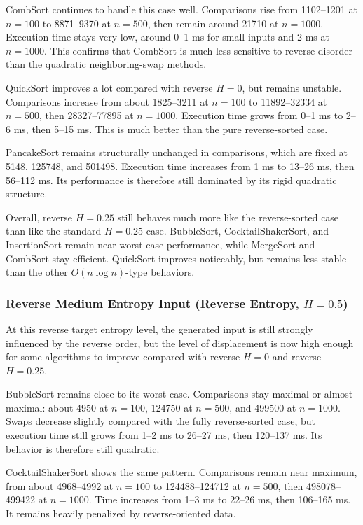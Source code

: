 \documentclass{article}
\begin{document}
CombSort continues to handle this case well. Comparisons rise from 1102--1201 at $n=100$ to 8871--9370 at $n=500$, then remain around 21710 at $n=1000$. Execution time stays very low, around 0--1 ms for small inputs and 2 ms at $n=1000$. This confirms that CombSort is much less sensitive to reverse disorder than the quadratic neighboring-swap methods.

QuickSort improves a lot compared with reverse $H=0$, but remains unstable. Comparisons increase from about 1825--3211 at $n=100$ to 11892--32334 at $n=500$, then 28327--77895 at $n=1000$. Execution time grows from 0--1 ms to 2--6 ms, then 5--15 ms. This is much better than the pure reverse-sorted case.

PancakeSort remains structurally unchanged in comparisons, which are fixed at 5148, 125748, and 501498. Execution time increases from 1 ms to 13--26 ms, then 56--112 ms. Its performance is therefore still dominated by its rigid quadratic structure.

Overall, reverse $H=0.25$ still behaves much more like the reverse-sorted case than like the standard $H=0.25$ case. BubbleSort, CocktailShakerSort, and InsertionSort remain near worst-case performance, while MergeSort and CombSort stay efficient. QuickSort improves noticeably, but remains less stable than the other $O(n \log n)$-type behaviors.


\subsubsection{Reverse Medium Entropy Input (Reverse Entropy, $H = 0.5$)}

At this reverse target entropy level, the generated input is still strongly influenced by the reverse order, but the level of displacement is now high enough for some algorithms to improve compared with reverse $H=0$ and reverse $H=0.25$.

BubbleSort remains close to its worst case. Comparisons stay maximal or almost maximal: about 4950 at $n=100$, 124750 at $n=500$, and 499500 at $n=1000$. Swaps decrease slightly compared with the fully reverse-sorted case, but execution time still grows from 1--2 ms to 26--27 ms, then 120--137 ms. Its behavior is therefore still quadratic.

CocktailShakerSort shows the same pattern. Comparisons remain near maximum, from about 4968--4992 at $n=100$ to 124488--124712 at $n=500$, then 498078--499422 at $n=1000$. Time increases from 1--3 ms to 22--26 ms, then 106--165 ms. It remains heavily penalized by reverse-oriented data.
\end{document}
